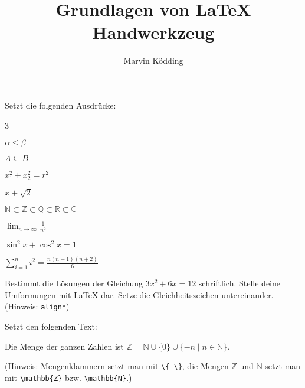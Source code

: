 \documentclass[a4paper, 12pt]{mksheetphhd}
\title{Grundlagen von \LaTeX\\\small Handwerkzeug}
\author{Marvin Ködding}
\begin{document}
	\printtitle
	
	\vspace*{.5cm}
	
	\begin{aufgabe}
		Setzt die folgenden Ausdrücke:
		\begin{enumerate}
		\end{enumerate}
	\end{aufgabe}
	
	\begin{aufgabe}
		Bestimmt die Lösungen der Gleichung $3x^2+6x=12$ schriftlich. Stelle deine Umformungen mit \LaTeX{} dar. Setze die Gleichheitszeichen untereinander. (Hinweis: \verb+align*+)
	\end{aufgabe}
	
	\begin{aufgabe}
		Setzt den folgenden Text:
		
		Die Menge der ganzen Zahlen ist $\mathbb{Z} = \mathbb{N} \cup \{0\} \cup \{-n \mid n \in \mathbb{N}\}$. 
		
		(Hinweis: Mengenklammern setzt man mit \verb|\{ \}|, die Mengen $\mathbb{Z}$ und $\mathbb{N}$ setzt man mit \verb|\mathbb{Z}| bzw. \verb|\mathbb{N}|.)
	\end{aufgabe}
	
	
\end{document}
